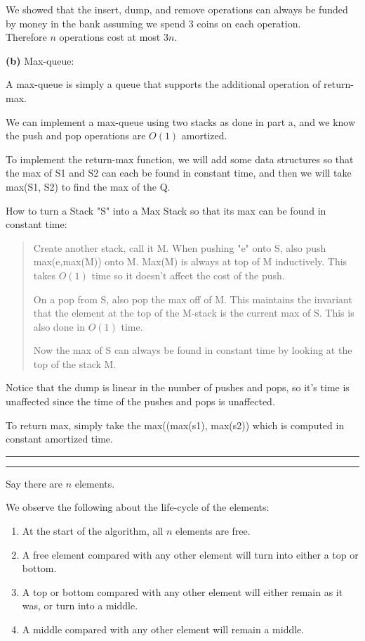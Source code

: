 \documentclass[11pt]{article}
\newcommand{\question}[2] {\vspace{.25in} \hrule\vspace{0.5em}
\noindent{\bf #1: #2} \vspace{0.5em}
\hrule \vspace{.10in}}
\renewcommand{\part}[1] {\vspace{.10in} {\bf (#1)}}
\begin{document}
We showed that the insert, dump, and remove operations can always be funded by money in the bank assuming we spend 3 coins on each operation.\\
Therefore $n$ operations cost at most $3n$.

\part{b} Max-queue:

A max-queue is simply a queue that supports the additional operation of return-max.

We can implement a max-queue using two stacks as done in part a, and we know the push and pop operations are $O(1)$ amortized.

To implement the return-max function, we will add some data structures so that the max of S1 and S2 can each be found in constant time, and then we will take max(S1, S2) to find the max of the Q.

How to turn a Stack "S" into a Max Stack so that its max can be found in constant time:

\begin{quote}
Create another stack, call it M.
When pushing "e" onto S, also push max(e,max(M)) onto M. Max(M) is always at top of M inductively.
This takes $O(1)$ time so it doesn't affect the cost of the push.

On a pop from S, also pop the max off of M.
This maintains the invariant that the element at the top of the M-stack is the current max of S.
This is also done in $O(1)$ time.

Now the max of S can always be found in constant time by looking at the top of the stack M.
\end{quote}

Notice that the dump is linear in the number of pushes and pops, so it's time is unaffected since the time of the pushes and pops is unaffected.

To return max, simply take the max((max(s1), max(s2)) which is computed in constant amortized time.


\question{2}{You Be the Adversary}

Say there are $n$ elements.

We observe the following about the life-cycle of the elements:

\begin{enumerate}
\item At the start of the algorithm, all $n$ elements are free.
\item A free element compared with any other element will turn into either a top or bottom.
\item A top or bottom compared with any other element will either remain as it was, or turn into a middle.
\item A middle compared with any other element will remain a middle.
\end{enumerate}
\end{document}
